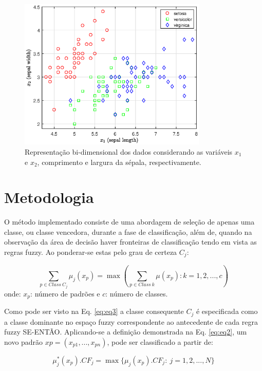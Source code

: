 \documentclass[12pt,a4paper]{article}
\numberwithin{equation}{section}
\begin{document}
\begin{figure}[ht]
\centering
\includegraphics[width=0.8\textwidth]{figures/data.eps}
\caption{Representação bi-dimensional dos dados considerando as variáveis $x_1$ e $x_2$, comprimento e largura da sépala, respectivamente.}
\label{fig:data}
\end{figure}

\section{Metodologia}

O método implementado consiste de uma abordagem de seleção de apenas uma classe, ou classe vencedora, durante a fase de classificação, além de, quando na observação da área de decisão haver fronteiras de classificação tendo em vista as regras fuzzy. Ao ponderar-se estas pelo grau de certeza $C_{j}$:

\begin{equation} \label{eq:eq3}
\sum_{p\in Class~C_{j}} \mu_{j}(x_p)=\max(\sum_{p\in Class~k}\mu(x_{p}):k=1,2,...,c)
\end{equation}
onde: $x_{p}$: número de padrões e $c$: número de classes.

Como pode ser visto na Eq. \eqref{eq:eq3} a classe consequente $C_{j}$ é especificada como a classe dominante no espaço fuzzy correspondente ao antecedente de cada regra fuzzy SE-ENTÃO. Aplicando-se a definição demonstrada na Eq. \eqref{eq:eq2}, um novo padrão $x{p}=(x_{p1},...,x_{pn})$, pode ser classificado a partir de:

\begin{equation} \label{eq:eq4}
\mu_{j}^{ *}(x_{p}).CF_{j}=\max\lbrace\mu_{j}(x_{p}).CF_{j}:~j=1,2,...,N\rbrace
\end{equation}
\end{document}
